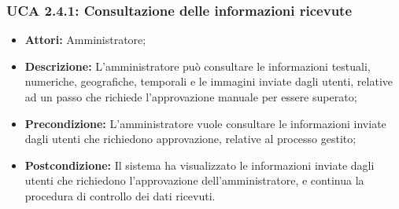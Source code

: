 \hypertarget{A2.4.1}{}
\subsubsection{UCA 2.4.1: Consultazione delle informazioni ricevute}
\begin{itemize}
\item \textbf{Attori:}
Amministratore;
\item \textbf{Descrizione:}
L'amministratore può consultare le informazioni testuali, numeriche, geografiche, temporali e le immagini inviate dagli utenti, relative ad un passo che richiede l'approvazione manuale per essere superato;
\item \textbf{Precondizione:}
L'amministratore vuole consultare le informazioni inviate dagli utenti che richiedono approvazione, relative al processo gestito;
\item \textbf{Postcondizione:}
Il sistema ha visualizzato le informazioni inviate dagli utenti che richiedono l'approvazione dell'amministratore, e continua la procedura di controllo dei dati ricevuti.
\end{itemize}

\hypertarget{A2.4.2}{}
